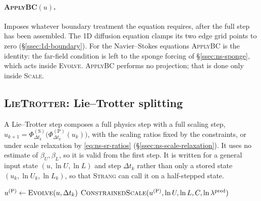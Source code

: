 \documentclass{article}
\begin{document}
\paragraph{\textsc{ApplyBC}$(u)$.}
Imposes whatever boundary treatment the equation requires, after the full step
has been assembled. The 1D diffusion equation clamps its two edge grid
points to zero (\S\ref{ssec:1d-boundary}). For the Navier--Stokes equations
\textsc{ApplyBC} is the identity: the far-field condition is left to the
sponge forcing of \S\ref{ssec:ns-sponge}, which acts inside \textsc{Evolve}.
\textsc{ApplyBC} performs no projection; that is done only inside
\textsc{Scale}.

\subsection{\textsc{LieTrotter}: Lie--Trotter splitting}\label{ssec:alg-lie-trotter}
A Lie--Trotter step composes a full physics step with a full scaling step,
$u_{k+1} = \Phi_{\Delta t_k}^{(\mathrm{S})}\bigl(\Phi_{\Delta t_k}^{(\mathrm{P})}(u_k)\bigr)$,
with the scaling ratios fixed by the constraints, or under scale relaxation
by \eqref{eq:ns-sr-ratios} (\S\ref{ssec:ns-scale-relaxation}). It uses no estimate of
$\beta_U, \beta_L$, so it is valid from the first step. It is written for a
general input state $(u, \ln U, \ln L)$ and step $\Delta t_k$ rather than only a stored state
$(u_k, \ln U_k, \ln L_k)$, so that \textsc{Strang} can call it on a
half-stepped state.
\begin{algorithm}[H]
\caption{Lie--Trotter step}
\begin{algorithmic}[1]
  \State $u^{(\mathrm{P})} \gets \Call{Evolve}{u, \Delta t_k}$ \Comment{\S\ref{ssec:alg-substeps}}
  \State \Return $\Call{ConstrainedScale}{u^{(\mathrm{P})}, \ln U, \ln L, C, \ln \lambda^{\mathrm{pred}}}$ \Comment{\S\ref{ssec:alg-substeps}}
\EndFunction
\end{algorithmic}
\end{algorithm}
\end{document}
